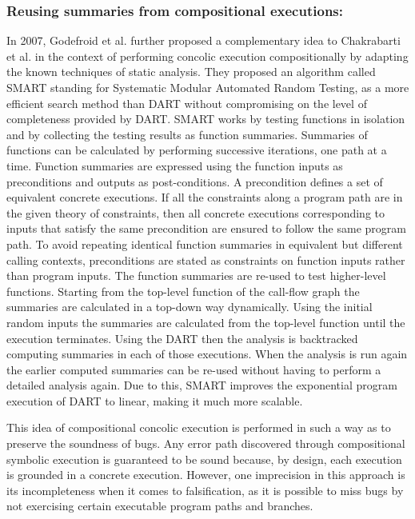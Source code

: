 \documentclass[ runningheads,
               a4paper]{llncs}
\begin{document}
\subsubsection{Reusing summaries from compositional executions:}
In 2007, Godefroid et al. \cite{godefroid2007compositional} further proposed a complementary idea \cite{godefroid2007compositional} to Chakrabarti et al. \cite{chakrabarti2006software} in the context of performing concolic execution compositionally by adapting the known techniques of static analysis. They proposed an algorithm called SMART standing for Systematic Modular Automated Random Testing, as a more efficient search method than DART \cite{godefroid2005dart} without compromising on the level of completeness provided by DART. SMART works by testing functions in isolation and by collecting the testing results as function summaries. Summaries of functions can be calculated by performing successive iterations, one path at a time. Function summaries are expressed using the function inputs as preconditions and outputs as post-conditions. A precondition defines a set of equivalent concrete executions. If all the constraints along a program path are in the given theory of constraints, then all concrete executions corresponding to inputs that satisfy the same precondition are ensured to follow the same program path. To avoid repeating identical function summaries in equivalent but different calling contexts, preconditions are stated as constraints on function inputs rather than program inputs. The function summaries are re-used to test higher-level functions. Starting from the top-level function of the call-flow graph the summaries are calculated in a top-down way dynamically. Using the initial random inputs the summaries are calculated from the top-level function until the execution terminates. Using the DART then the analysis is backtracked computing summaries in each of those executions. When the analysis is run again the earlier computed summaries can be re-used without having to perform a detailed analysis again. Due to this, SMART improves the exponential program execution of DART to linear, making it much more scalable.

This idea of compositional concolic execution is performed in such a way as to preserve the soundness of bugs. Any error path discovered through compositional symbolic execution is guaranteed to be sound because, by design, each execution is grounded in a concrete execution. However, one imprecision in this approach is its incompleteness when it comes to falsification, as it is possible to miss bugs by not exercising certain executable program paths and branches.
\end{document}
